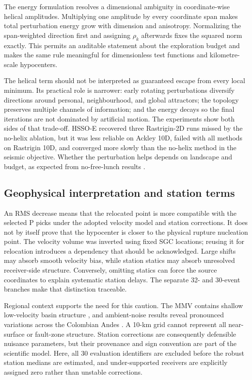 \documentclass[10pt]{article}
\begin{document}
The energy formulation resolves a dimensional ambiguity in coordinate-wise helical amplitudes. Multiplying one amplitude by every coordinate span makes total perturbation energy grow with dimension and anisotropy. Normalizing the span-weighted direction first and assigning $\rho_k$ afterwards fixes the squared norm exactly. This permits an auditable statement about the exploration budget and makes the same rule meaningful for dimensionless test functions and kilometre-scale hypocenters.

The helical term should not be interpreted as guaranteed escape from every local minimum. Its practical role is narrower: early rotating perturbations diversify directions around personal, neighbourhood, and global attractors; the topology preserves multiple channels of information; and the energy decays so the final iterations are not dominated by artificial motion. The experiments show both sides of that trade-off. HSSO-E recovered three Rastrigin-2D runs missed by the no-helix ablation, but it was less reliable on Ackley 10D, failed with all methods on Rastrigin 10D, and converged more slowly than the no-helix method in the seismic objective. Whether the perturbation helps depends on landscape and budget, as expected from no-free-lunch results \citep{WolpertMacready1997}.

\subsection{Geophysical interpretation and station terms}

An RMS decrease means that the relocated point is more compatible with the selected P picks under the adopted velocity model and station corrections. It does not by itself prove that the hypocenter is closer to the physical rupture nucleation point. The velocity volume was inverted using fixed SGC locations; reusing it for relocation introduces a dependency that should be acknowledged. Large shifts may absorb smooth velocity bias, while station statics may absorb unresolved receiver-side structure. Conversely, omitting statics can force the source coordinates to explain systematic station delays. The separate 32- and 30-event branches make that distinction traceable.

Regional context supports the need for this caution. The MMV contains shallow low-velocity basin structure \citep{Londono2020}, and ambient-noise results reveal pronounced variations across the Colombian Andes \citep{Poveda2018}. A 10-km grid cannot represent all near-surface or fault-zone structure. Station corrections are consequently defensible nuisance parameters, but their provenance and sign convention are part of the scientific model. Here, all 30 evaluation identifiers are excluded before the robust station medians are estimated, and under-supported receivers are explicitly assigned zero rather than unstable corrections.
\end{document}
